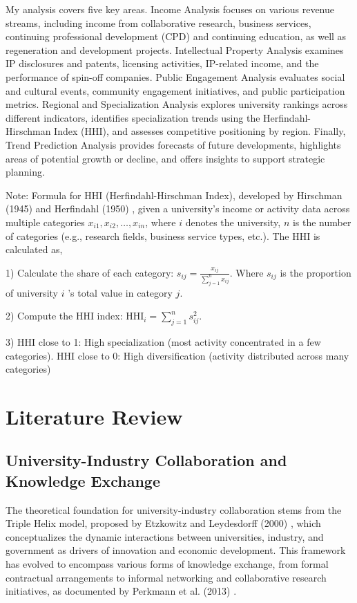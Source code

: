 \documentclass[journal,onecolumn, 10pt,draftclsnofoot]{IEEEtran}
\begin{document}
My analysis covers five key areas. Income Analysis focuses on various revenue streams, including income from collaborative research, business services, continuing professional development (CPD) and continuing education, as well as regeneration and development projects. Intellectual Property Analysis examines IP disclosures and patents, licensing activities, IP-related income, and the performance of spin-off companies. Public Engagement Analysis evaluates social and cultural events, community engagement initiatives, and public participation metrics. Regional and Specialization Analysis explores university rankings across different indicators, identifies specialization trends using the Herfindahl-Hirschman Index (HHI), and assesses competitive positioning by region. Finally, Trend Prediction Analysis provides forecasts of future developments, highlights areas of potential growth or decline, and offers insights to support strategic planning.

Note: Formula for HHI (Herfindahl-Hirschman Index), developed by Hirschman (1945) \cite{hirschman1945national} and Herfindahl (1950) \cite{herfindahl1950concentration}, given a university's income or activity data across multiple categories $x_{i 1}, x_{i 2}, \ldots, x_{i n}$, where $i$ denotes the university, $n$ is the number of categories (e.g., research fields, business service types, etc.). The HHI is calculated as,

1) Calculate the share of each category: $s_{i j}=\frac{x_{i j}}{\sum_{j=1}^n x_{i j}}$. Where $s_{i j}$ is the proportion of university $i$ 's total value in category $j$.

2) Compute the HHI index: $\mathrm{HHI}_i=\sum_{j=1}^n s_{i j}^2$.

3) HHI close to 1: High specialization (most activity concentrated in a few categories). HHI close to 0: High diversification (activity distributed across many categories)

\section{Literature Review}

\subsection{University-Industry Collaboration and Knowledge Exchange}

The theoretical foundation for university-industry collaboration stems from the Triple Helix model, proposed by Etzkowitz and Leydesdorff (2000) \cite{etzkowitz2000dynamics}, which conceptualizes the dynamic interactions between universities, industry, and government as drivers of innovation and economic development. This framework has evolved to encompass various forms of knowledge exchange, from formal contractual arrangements to informal networking and collaborative research initiatives, as documented by Perkmann et al. (2013) \cite{perkmann2013academic}.
\end{document}
